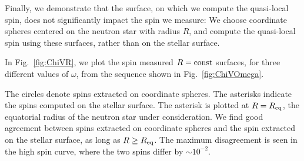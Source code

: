 \documentclass[aps,prd,amsmath,floatfix
,twocolumn
,superscriptaddress,nofootinbib,showpacs]{revtex4-1}
\theoremstyle{plain} \newtheorem{thm}{Theorem} \newtheorem{lem}{Lemma}
\newcommand{\red}[1]{\textcolor{Red}{#1}}
\begin{document}




Finally, we demonstrate that the surface, on which we compute the
quasi-local spin, does not significantly impact the spin we measure:
We choose coordinate spheres centered on the neutron star with radius
$R$, and compute the quasi-local spin using these surfaces,
rather than on the stellar surface.

In Fig.~\ref{fig:ChiVR}, we plot the spin measured $R=\rm{const}$ surfaces, for three
different values of $\omega$, from the sequence shown in Fig.~\ref{fig:ChiVOmega}. 

The circles denote spins extracted on coordinate spheres.  The asterisks
indicate the spins computed on the stellar surface. The asterisk is
plotted at $R=R_{\rm eq}$, the equatorial radius of the neutron star
under consideration.  
We find good agreement between spins extracted on coordinate spheres and
the spin extracted on the stellar surface, as long as $R\ge R_{\rm eq}$. 
 The maximum disagreement is seen in the high spin curve, where
the two spins differ by $\sim 10^{-2}$.  
\end{document}
